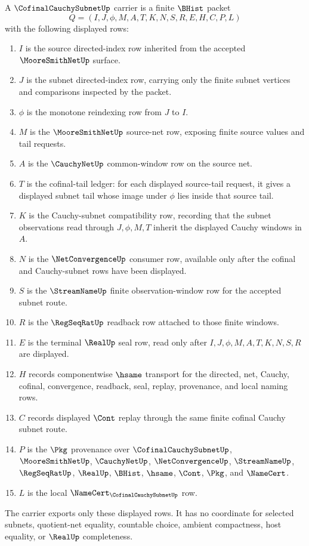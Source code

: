\begin{definition}
\label{def:cofinal-cauchy-subnet-carrier}
A $\CofinalCauchySubnetUp$ carrier is a finite $\BHist$ packet
$$
Q=(I,J,\phi,M,A,T,K,N,S,R,E,H,C,P,L)
$$
with the following displayed rows:
\begin{enumerate}
\item $I$ is the source directed-index row inherited from the accepted $\MooreSmithNetUp$ surface.
\item $J$ is the subnet directed-index row, carrying only the finite subnet vertices and comparisons inspected by the packet.
\item $\phi$ is the monotone reindexing row from $J$ to $I$.
\item $M$ is the $\MooreSmithNetUp$ source-net row, exposing finite source values and tail requests.
\item $A$ is the $\CauchyNetUp$ common-window row on the source net.
\item $T$ is the cofinal-tail ledger: for each displayed source-tail request, it gives a displayed subnet tail whose image under $\phi$ lies inside that source tail.
\item $K$ is the Cauchy-subnet compatibility row, recording that the subnet observations read through $J,\phi,M,T$ inherit the displayed Cauchy windows in $A$.
\item $N$ is the $\NetConvergenceUp$ consumer row, available only after the cofinal and Cauchy-subnet rows have been displayed.
\item $S$ is the $\StreamNameUp$ finite observation-window row for the accepted subnet route.
\item $R$ is the $\RegSeqRatUp$ readback row attached to those finite windows.
\item $E$ is the terminal $\RealUp$ seal row, read only after $I,J,\phi,M,A,T,K,N,S,R$ are displayed.
\item $H$ records componentwise $\hsame$ transport for the directed, net, Cauchy, cofinal, convergence, readback, seal, replay, provenance, and local naming rows.
\item $C$ records displayed $\Cont$ replay through the same finite cofinal Cauchy subnet route.
\item $P$ is the $\Pkg$ provenance over $\CofinalCauchySubnetUp$, $\MooreSmithNetUp$, $\CauchyNetUp$, $\NetConvergenceUp$, $\StreamNameUp$, $\RegSeqRatUp$, $\RealUp$, $\BHist$, $\hsame$, $\Cont$, $\Pkg$, and $\NameCert$.
\item $L$ is the local $\NameCert_{\CofinalCauchySubnetUp}$ row.
\end{enumerate}
The carrier exports only these displayed rows. It has no coordinate for selected subnets, quotient-net equality, countable choice, ambient compactness, host equality, or $\RealUp$ completeness.
\end{definition}

